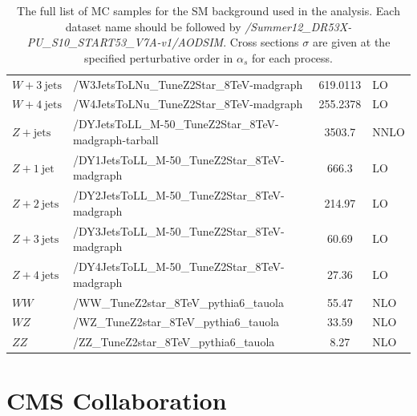 \documentclass[12pt]{thesis}  %
\begin{document}
{\begin{landscape}
\begin{table}[hbt]
\begin{center}
{\begin{tabular}{|l|l|c|l|}
$W + 3~\text{jets}$                         & /W3JetsToLNu\_TuneZ2Star\_8TeV-madgraph                     & 619.0113 & LO  \\
$W + 4~\text{jets}$                         & /W4JetsToLNu\_TuneZ2Star\_8TeV-madgraph                     & 255.2378 & LO  \\
$Z + \text{jets}$                           & /DYJetsToLL\_M-50\_TuneZ2Star\_8TeV-madgraph-tarball        & 3503.7   & NNLO \\
$Z + 1~\text{jet}$                          & /DY1JetsToLL\_M-50\_TuneZ2Star\_8TeV-madgraph               & 666.3    & LO \\
$Z + 2~\text{jets}$                         & /DY2JetsToLL\_M-50\_TuneZ2Star\_8TeV-madgraph               & 214.97   & LO \\
$Z + 3~\text{jets}$                         & /DY3JetsToLL\_M-50\_TuneZ2Star\_8TeV-madgraph               & 60.69    & LO \\
$Z + 4~\text{jets}$                         & /DY4JetsToLL\_M-50\_TuneZ2Star\_8TeV-madgraph               & 27.36    & LO \\
$WW$                                        & /WW\_TuneZ2star\_8TeV\_pythia6\_tauola                      & 55.47    & NLO \\
$WZ$                                        & /WZ\_TuneZ2star\_8TeV\_pythia6\_tauola                      & 33.59    & NLO \\
$ZZ$                                        & /ZZ\_TuneZ2star\_8TeV\_pythia6\_tauola                      & 8.27     & NLO \\
\hline
\end{tabular}
}
\caption{The full list of MC samples for the SM background used in the analysis. Each dataset name should be followed by \emph{/Summer12\_DR53X-PU\_S10\_START53\_V7A-v1/AODSIM}. Cross sections $\sigma$ are given at the specified perturbative order in $\alpha_{s}$ for each process.}
\label{tab:mcsamplesBG}
\end{center}
\end{table}
\end{landscape}
}
\chapter{CMS Collaboration
\label{ch:collaboration}}
\end{document}
